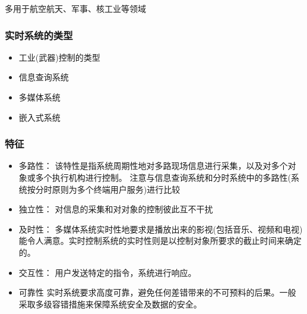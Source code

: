 \documentclass[]{scrartcl}
\begin{document}
	多用于航空航天、军事、核工业等领域
		\subsubsection{实时系统的类型} 
			\begin{itemize}
				\item 工业(武器)控制的类型
				\item 信息查询系统
				\item 多媒体系统
				\item  嵌入式系统
			\end{itemize}
    	\subsubsection{特征}
		\begin{itemize}
			\item 多路性：  
			该特性是指系统周期性地对多路现场信息进行采集，以及对多个对象或多个执行机构进行控制。
			注意与信息查询系统和分时系统中的多路性(系统按分时原则为多个终端用户服务)进行比较
			\item 独立性：  
			对信息的采集和对对象的控制彼此互不干扰
			\item 及时性：  
			多媒体系统实时性地要求是播放出来的影视(包括音乐、视频和电视)能令人满意。实时控制系统的实时性则是以控制对象所要求的截止时间来确定的。
			\item 交互性：  
			用户发送特定的指令，系统进行响应。
			\item 可靠性 实时系统要求高度可靠，避免任何差错带来的不可预料的后果。一般采取多级容错措施来保障系统安全及数据的安全。
		\end{itemize}
\end{document}
